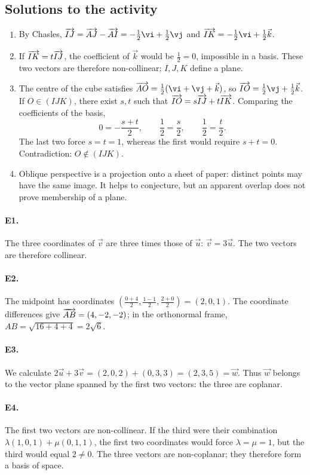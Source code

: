 \subsection{Solutions to the activity}\begin{enumerate}
\item By Chasles, $\vect{IJ}=\vect{AJ}-\vect{AI}=-\frac12\vi +\frac12\vj $ and $\vect{IK}=-\frac12\vi +\frac12\vec k$.
\item If $\overrightarrow{IK}=t\overrightarrow{IJ}$, the coefficient of $\vec k$ would be $\frac{1}{2}=0$, impossible in a basis. These two vectors are therefore non-collinear; $I,J,K$ define a plane.
\item The centre of the cube satisfies $\vect{AO}=\frac12(\vi +\vj +\vec k)$, so $\vect{IO}=\frac12\vj +\frac12\vec k$. If $O\in(IJK)$, there exist $s,t$ such that $\overrightarrow{IO}=s\overrightarrow{IJ}+t\overrightarrow{IK}$. Comparing the coefficients of the basis,
\[0=-\frac{s+t}2,\qquad \frac12=\frac s2,\qquad \frac12=\frac t2.\]
The last two force $s=t=1$, whereas the first would require $s+t=0$. Contradiction: $O\notin(IJK)$.
\item Oblique perspective is a projection onto a sheet of paper: distinct points may have the same image. It helps to conjecture, but an apparent overlap does not prove membership of a plane.
\end{enumerate}

\paragraph{E1.}The three coordinates of $\vec v$ are three times those of $\vec u$: $\vec v=3\vec u$. The two vectors are therefore collinear.

\paragraph{E2.}The midpoint has coordinates $(\frac{0+4}{2},\frac{1-1}{2},\frac{2+0}{2})=(2,0,1)$. The coordinate differences give $\overrightarrow{AB}=(4,-2,-2)$; in the orthonormal frame, $AB=\sqrt{16+4+4}=2\sqrt6$.

\paragraph{E3.}We calculate $2\vec u+3\vec v=(2,0,2)+(0,3,3)=(2,3,5)=\vec w$. Thus $\vec w$ belongs to the vector plane spanned by the first two vectors: the three are coplanar.

\paragraph{E4.}The first two vectors are non-collinear. If the third were their combination $\lambda(1,0,1)+\mu(0,1,1)$, the first two coordinates would force $\lambda=\mu=1$, but the third would equal $2\ne0$. The three vectors are non-coplanar; they therefore form a basis of space.

